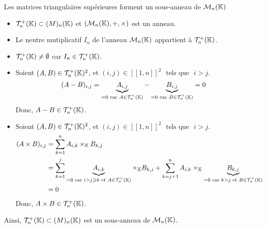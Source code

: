 \documentclass{article}
\begin{document}
\begin{question_kholle}
	{Les matrices triangulaires supérieures forment un sous-anneau de $\mathcal{M}_n(\mathbb K)$}
	\hfill \\
	\begin{itemize}[label=$\star$]
		\item $\mathcal{T}_n^+(\mathbb K) \subset \mathcal(M)_n(\mathbb K)$ et $(\mathcal{M}_n(\mathbb K), +, \times)$ est un anneau.
		\item Le neutre mutiplicatif $I_{n}$ de l’anneau $\mathcal{M}_n(\mathbb K)$ appartient à $\mathcal{T}_n^+(\mathbb K)$.
		\item $\mathcal{T}_n^+(\mathbb K) \neq \emptyset$ car $I_n \in \mathcal{T}_n^+(\mathbb K)$.
		\item Soient $(A, B) \in \mathcal{T}_n^+(\mathbb K)^2$, et $(i, j) \in [\![1,n]\!]^2$ $\text{ tels que }$ $i > j$.
		      \begin{equation*}
			      (A - B)_{i,j}
			      = \underbrace{A_{i,j}}_{=0 \text{ car } A \in \mathcal{T}_n^+(\mathbb K)} - \underbrace{B_{i,j}}_{=0 \text{ car } B \in \mathcal{T}_n^+(\mathbb K)}
			      = 0
		      \end{equation*}
		      Donc, $A - B \in \mathcal{T}_n^+(\mathbb K)$.

		\item Soient $(A, B) \in \mathcal{T}_n^+(\mathbb K)^2$, et $(i, j) \in [\![1,n]\!]^2$ $\text{ tels que }$ $i > j$.
		      \begin{align*}
			      (A \times B)_{i,j}
			       & = \sum_{k=1}^{n} A_{i,k} \times_{\mathbb K} B_{k,j}                                                                                        \\
			       & = \sum_{k=1}^{j} \underbrace{A_{i,k}}_{=0 \text{ car } i > j \geqslant k \text{ et } A \in \mathcal{T}_n^+(\mathbb K)} \times_{\mathbb K} B_{k,j}
			      + \sum_{k=j+1}^{n} A_{i,k} \times_{\mathbb K} \underbrace{B_{k,j}}_{=0 \text{ car } k > j \text{ et } B \in \mathcal{T}_n^+(\mathbb K)}              \\
			       & = 0
		      \end{align*}
		      Donc, $A \times B \in \mathcal{T}_n^+(\mathbb K)$.
	\end{itemize}
	Ainsi, $\mathcal{T}_n^+(\mathbb K) \subset \mathcal(M)_n(\mathbb K)$ est un sous-anneau de $\mathcal{M}_n(\mathbb K)$.
\end{question_kholle}
\end{document}
